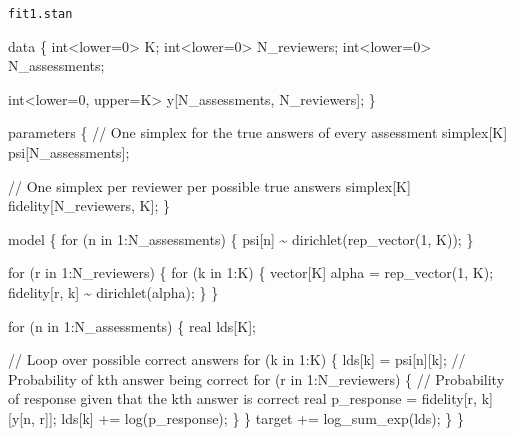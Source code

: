 \documentclass[
  letterpaper,
  DIV=11,
  numbers=noendperiod]{scrartcl}
\newenvironment{Shaded}{\begin{snugshade}}{\end{snugshade}}
\newcommand{\CommentTok}[1]{\textcolor[rgb]{0.37,0.37,0.37}{#1}}
\newcommand{\ControlFlowTok}[1]{\textcolor[rgb]{0.00,0.23,0.31}{#1}}
\newcommand{\DataTypeTok}[1]{\textcolor[rgb]{0.68,0.00,0.00}{#1}}
\newcommand{\DecValTok}[1]{\textcolor[rgb]{0.68,0.00,0.00}{#1}}
\newcommand{\KeywordTok}[1]{\textcolor[rgb]{0.00,0.23,0.31}{#1}}
\newcommand{\NormalTok}[1]{\textcolor[rgb]{0.00,0.23,0.31}{#1}}
\begin{document}
\begin{codelisting}

\caption{\texttt{fit1.stan}}

\begin{Shaded}
\begin{Highlighting}[]
\KeywordTok{data}\NormalTok{ \{}
  \DataTypeTok{int}\NormalTok{\textless{}}\KeywordTok{lower}\NormalTok{=}\DecValTok{0}\NormalTok{\textgreater{} K;}
  \DataTypeTok{int}\NormalTok{\textless{}}\KeywordTok{lower}\NormalTok{=}\DecValTok{0}\NormalTok{\textgreater{} N\_reviewers;}
  \DataTypeTok{int}\NormalTok{\textless{}}\KeywordTok{lower}\NormalTok{=}\DecValTok{0}\NormalTok{\textgreater{} N\_assessments;}

  \DataTypeTok{int}\NormalTok{\textless{}}\KeywordTok{lower}\NormalTok{=}\DecValTok{0}\NormalTok{, }\KeywordTok{upper}\NormalTok{=K\textgreater{} y[N\_assessments, N\_reviewers];}
\NormalTok{\}}

\KeywordTok{parameters}\NormalTok{ \{}
  \CommentTok{// One simplex for the true answers of every assessment}
  \DataTypeTok{simplex}\NormalTok{[K] psi[N\_assessments];}
  
  \CommentTok{// One simplex per reviewer per possible true answers}
  \DataTypeTok{simplex}\NormalTok{[K] fidelity[N\_reviewers, K];}
\NormalTok{\}}

\KeywordTok{model}\NormalTok{ \{}
  \ControlFlowTok{for}\NormalTok{ (n }\ControlFlowTok{in} \DecValTok{1}\NormalTok{:N\_assessments) \{}
\NormalTok{    psi[n] \textasciitilde{} dirichlet(rep\_vector(}\DecValTok{1}\NormalTok{, K));}
\NormalTok{  \}}
  
  \ControlFlowTok{for}\NormalTok{ (r }\ControlFlowTok{in} \DecValTok{1}\NormalTok{:N\_reviewers) \{}
    \ControlFlowTok{for}\NormalTok{ (k }\ControlFlowTok{in} \DecValTok{1}\NormalTok{:K) \{}
      \DataTypeTok{vector}\NormalTok{[K] alpha = rep\_vector(}\DecValTok{1}\NormalTok{, K);}
\NormalTok{      fidelity[r, k] \textasciitilde{} dirichlet(alpha);}
\NormalTok{    \}}
\NormalTok{  \}}
  
  \ControlFlowTok{for}\NormalTok{ (n }\ControlFlowTok{in} \DecValTok{1}\NormalTok{:N\_assessments) \{}
    \DataTypeTok{real}\NormalTok{ lds[K];}
    
    \CommentTok{// Loop over possible correct answers}
    \ControlFlowTok{for}\NormalTok{ (k }\ControlFlowTok{in} \DecValTok{1}\NormalTok{:K) \{}
\NormalTok{      lds[k] = psi[n][k]; }\CommentTok{// Probability of kth answer being correct }
      \ControlFlowTok{for}\NormalTok{ (r }\ControlFlowTok{in} \DecValTok{1}\NormalTok{:N\_reviewers) \{}
        \CommentTok{// Probability of response given that the kth answer is correct}
        \DataTypeTok{real}\NormalTok{ p\_response = fidelity[r, k][y[n, r]];}
\NormalTok{        lds[k] += log(p\_response);}
\NormalTok{      \}}
\NormalTok{    \}}
    \KeywordTok{target +=}\NormalTok{ log\_sum\_exp(lds);}
\NormalTok{  \}}
\NormalTok{\}}


\end{Highlighting}
\end{Shaded}
\end{codelisting}
\end{document}
